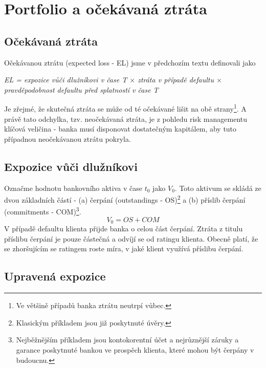 \chapter{Portfolio a očekávaná ztráta}

\section{Očekávaná ztráta}

Očekávanou ztrátu (expected loss - EL) jsme v předchozím textu definovali jako
\begin{center}
\textit{EL = expozice vůči dlužníkovi v čase T $\times$ ztráta v případě defaultu $\times$ pravděpodobnost defaultu před splatností v čase T}
\end{center}
Je zřejmé, že skutečná ztráta se může od té očekávané lišit na obě strany\footnote{Ve většině případů banka ztrátu neutrpí vůbec.}. A právě tato odchylka, tzv. neočekávaná ztráta, je z pohledu risk managementu klíčová veličina - banka musí disponovat dostatečným kapitálem, aby tuto případnou neočekávanou ztrátu pokryla.

\section{Expozice vůči dlužníkovi}

Označme hodnotu bankovního aktiva v čase $t_0$ jako $V_0$. Toto aktivum se skládá ze dvou základních částí - (a) čerpání (outstandings - OS)\footnote{Klasickým příkladem jsou již poskytnuté úvěry.} a (b) příslib čerpání (commitments - COM)\footnote{Nejběžnějším příkladem jsou kontokorentní účet a nejrůznější záruky a garance poskytnuté bankou ve prospěch klienta, které mohou být čerpány v budoucnu.}.
\begin{equation}
V_0 = OS + COM
\end{equation}
V případě defaultu klienta přijde banka o celou část čerpání. Ztráta z titulu příslibu čerpání je pouze částečná a odvíjí se od ratingu klienta. Obecně platí, že se zhoršujícím se ratingem roste míra, v jaké klient využívá příslibu čerpání.

\section{Upravená expozice}

